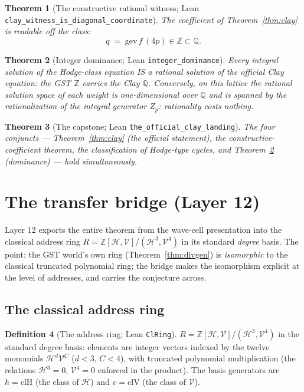 \documentclass[11pt,a4paper]{article}
\theoremstyle{plain}
\newtheorem{theorem}{Theorem}[section]
\theoremstyle{definition}
\newtheorem{definition}[theorem]{Definition}
\newcommand{\Z}{\mathbb{Z}}
\newcommand{\Q}{\mathbb{Q}}
\newcommand{\HC}{\mathcal{H}}
\newcommand{\VV}{\mathcal{V}}
\newcommand{\cycleClass}[1]{Z_{#1}}
\begin{document}
\begin{theorem}[The constructive rational witness; Lean
\texttt{clay\_witness\_is\_diagonal\_coordinate}]
The coefficient of Theorem~\ref{thm:clay} is readable off the class:
\[
  q \;=\; \mathrm{gev}\,f\,(4p) \in \Z \subset \Q.
\]
\end{theorem}

\begin{theorem}[Integer dominance; Lean \texttt{integer\_dominance}]
\label{thm:dominance}
Every \emph{integral} solution of the Hodge-class equation IS a
\emph{rational} solution of the official Clay equation: the GST $\Z$
carries the Clay $\Q$. Conversely, on this lattice the rational solution
space of each weight is one-dimensional over $\Q$ and is spanned by the
rationalization of the integral generator $\cycleClass{p}$: rationality
costs nothing.
\end{theorem}

\begin{theorem}[The capstone; Lean \texttt{the\_official\_clay\_landing}]
The four conjuncts --- Theorem~\ref{thm:clay} (the official statement),
the constructive-coefficient theorem, the classification of Hodge-type
cycles, and Theorem~\ref{thm:dominance} (dominance) --- hold
simultaneously.
\end{theorem}

\section{The transfer bridge (Layer 12)}\label{sec:bridge}

Layer 12 exports the entire theorem from the wave-cell presentation into the
classical address ring $R = \Z[\HC,\VV]/(\HC^{3},\VV^{4})$ in its standard
\emph{degree} basis. The point: the GST world's own ring
(Theorem~\ref{thm:divgen}) is \emph{isomorphic} to the classical truncated
polynomial ring; the bridge makes the isomorphism explicit at the level of
addresses, and carries the conjecture across.

\subsection{The classical address ring}

\begin{definition}[The address ring; Lean \texttt{ClRing}]\label{def:clring}
$R = \Z[\HC,\VV]/(\HC^{3},\VV^{4})$ in the standard degree basis: elements
are integer vectors indexed by the twelve monomials
$\HC^{d}\VV^{C}$ ($d<3$, $C<4$), with truncated polynomial multiplication
(the relations $\HC^{3} = 0$, $\VV^{4} = 0$ enforced in the product). The
basis generators are $h = \mathrm{clH}$ (the class of $\HC$) and
$v = \mathrm{clV}$ (the class of $\VV$).
\end{definition}
\end{document}
